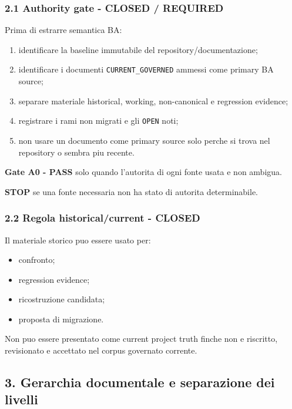 \documentclass[
  9pt,
  a4paper,
]{article}
\providecommand{\tightlist}{%
  \setlength{\itemsep}{0pt}\setlength{\parskip}{0pt}}
\begin{document}
\subsubsection{2.1 Authority gate - CLOSED /
REQUIRED}\label{authority-gate---closed-required}

Prima di estrarre semantica BA:

\begin{enumerate}
\def\labelenumi{\arabic{enumi}.}
\tightlist
\item
  identificare la baseline immutabile del repository/documentazione;
\item
  identificare i documenti \texttt{CURRENT\_GOVERNED} ammessi come
  primary BA source;
\item
  separare materiale historical, working, non-canonical e regression
  evidence;
\item
  registrare i rami non migrati e gli \texttt{OPEN} noti;
\item
  non usare un documento come primary source solo perche si trova nel
  repository o sembra piu recente.
\end{enumerate}

\textbf{Gate A0 - PASS} solo quando l'autorita di ogni fonte usata e non
ambigua.

\textbf{STOP} se una fonte necessaria non ha stato di autorita
determinabile.

\subsubsection{2.2 Regola historical/current -
CLOSED}\label{regola-historicalcurrent---closed}

Il materiale storico puo essere usato per:

\begin{itemize}
\tightlist
\item
  confronto;
\item
  regression evidence;
\item
  ricostruzione candidata;
\item
  proposta di migrazione.
\end{itemize}

Non puo essere presentato come current project truth finche non e
riscritto, revisionato e accettato nel corpus governato corrente.

\subsection{3. Gerarchia documentale e separazione dei
livelli}\label{gerarchia-documentale-e-separazione-dei-livelli}
\end{document}
